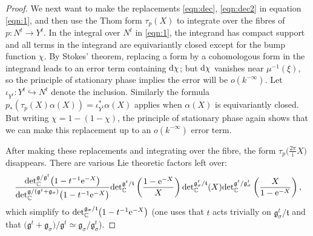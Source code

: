 \documentclass[11pt]{article}
\numberwithin{equation}{section}
\newcommand{\tn}[1]{\textnormal{#1}}
\renewcommand{\i}{{\mathrm{i}}}
\def\g{\ensuremath{\mathfrak{g}}}
\def\t{\ensuremath{\mathfrak{t}}}
\def\bC{\ensuremath{\mathbb{C}}}
\def\de{\ensuremath{\tn{det}_\bC}}
\begin{document}
\begin{proof}
We next want to make the replacements \eqref{eqn:dec}, \eqref{eqn:dec2} in equation \eqref{eqn:1}, and then use the Thom form $\tau_p(X)$ to integrate over the fibres of $p\colon N^t \rightarrow Y^t$. In the integral over $N^t$ in \eqref{eqn:1}, the integrand has compact support and all terms in the integrand are equivariantly closed except for the bump function $\chi$. By Stokes' theorem, replacing a form by a cohomologous form in the integrand leads to an error term containing ${\rm d}\chi$; but ${\rm d}\chi$ vanishes near $\mu^{-1}(\xi)$, so the principle of stationary phase implies the error will be $o(k^{-\infty})$. Let $\iota_{Y^t}\colon Y^t\hookrightarrow N^t$ denote the inclusion. Similarly the formula $p_\ast(\tau_p(X)\alpha(X))=\iota_{Y^t}^\ast \alpha(X)$ applies when $\alpha(X)$ is equivariantly closed. But writing $\chi=1-(1-\chi)$, the principle of stationary phase again shows that we can make this replacement up to an $o(k^{-\infty})$ error term.

After making these replacements and integrating over the fibre, the form $\tau_p\big(\tfrac{2\pi}{\i}X\big)$ disappears. There are various Lie theoretic factors left over:
\[ \frac{\de^{\g/\g^t}\big(1-t^{-1}{\rm e}^{-X}\big)}{\de^{\g/(\g^t+\g_\sigma)}\big(1-t^{-1}{\rm e}^{-X}\big)}\de^{\g^t/\t}\left(\frac{1-{\rm e}^{-X}}{X}\right)\de^{\g_\sigma^t/\t}(X)\de^{\g^t/\g_\sigma^t}\left(\frac{X}{1-{\rm e}^{-X}}\right),\]
which simplify to $\de^{\g_\sigma/\t}\big(1-t^{-1}{\rm e}^{-X}\big)$ (one uses that $t$ acts trivially on $\g_\sigma^t/\t$ and that $\big(\g^t+\g_\sigma\big)/\g^t\simeq \g_\sigma/\g_\sigma^t$).
\end{proof}
\end{document}
